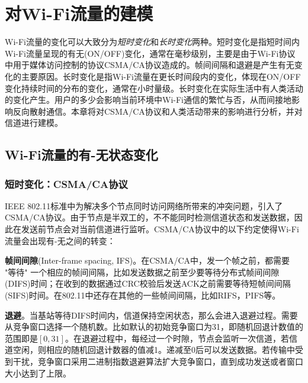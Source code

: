 
\chapter{对Wi-Fi流量的建模}
\label{chap:model}
Wi-Fi流量的变化可以大致分为\emph{短时变化}和\emph{长时变化}两种。短时变化是指短时间内Wi-Fi流量呈现的有无(ON/OFF)变化，通常在毫秒级别，主要是由于Wi-Fi协议中用于媒体访问控制的协议CSMA/CA协议造成的。帧间间隔和退避是产生有无变化的主要原因。长时变化是指Wi-Fi流量在更长时间段内的变化，体现在ON/OFF变化持续时间的分布的变化，通常在小时量级。长时变化在实际生活中有人类活动的变化产生。用户的多少会影响当前环境中Wi-Fi通信的繁忙与否，从而间接地影响反向散射通信。本章将对CSMA/CA协议和人类活动带来的影响进行分析，并对信道进行建模。
\section{Wi-Fi流量的有-无状态变化}
\subsection{短时变化：CSMA/CA协议}
IEEE 802.11标准中为解决多个节点同时访问网络所带来的冲突问题，引入了CSMA/CA协议。由于节点是半双工的，不不能同时检测信道状态和发送数据，因此在发送前节点会对当前信道进行监听。CSMA/CA协议中的以下约定使得Wi-Fi流量会出现有-无之间的转变：

\textbf{帧间间隙}(Inter-frame spacing, IFS)。在CSMA/CA中，发一个帧之前，都需要 "等待" 一个相应的帧间间隔，比如发送数据之前至少要等待分布式帧间间隙(DIFS)时间；在收到的数据通过CRC校验后发送ACK之前需要等待短帧间间隔(SIFS)时间。在802.11中还存在其他的一些帧间间隔，比如RIFS，PIFS等。

\textbf{退避}。当基站等待DIFS时间内，信道保持空闲状态，那么会进入退避过程。需要从竞争窗口选择一个随机数。比如默认的初始竞争窗口为31，即随机回退计数值的范围即是$[0,31]$。在退避过程中，每经过一个时隙，节点会监听一次信道，若信道空闲，则相应的随机回退计数器的值减1。递减至0后可以发送数据。若传输中受到干扰，竞争窗口采用二进制指数退避算法扩大竞争窗口，直到成功发送或者窗口大小达到了上限。


